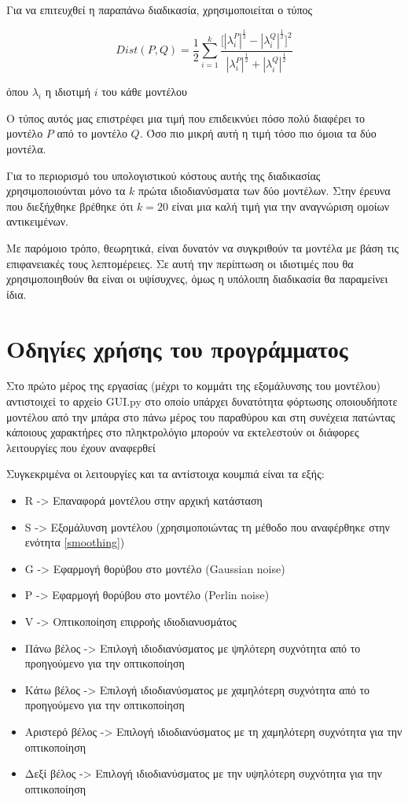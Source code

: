 \documentclass{article}
\begin{document}
Για να επιτευχθεί η παραπάνω διαδικασία, χρησιμοποιείται ο τύπος

\[
	Dist(P, Q) = {
		\frac {1} {2}
		\sum^{k}_{i=1} {
			\frac
			{
				\Big[
					|\lambda^{P}_{i}|^{\frac{1}{2}} - |\lambda^{Q}_{i}|^{\frac{1}{2}}
				\Big]^2
			}
			{
				|\lambda^{P}_{i}|^{\frac{1}{2}} + |\lambda^{Q}_{i}|^{\frac{1}{2}}
			}
		}
	}
\]

\noindent
όπου $\lambda_{i}$ η ιδιοτιμή $i$ του κάθε μοντέλου

Ο τύπος αυτός μας επιστρέφει μια τιμή που επιδεικνύει πόσο πολύ διαφέρει το μοντέλο
$P$ από το μοντέλο $Q$. Όσο πιο μικρή αυτή η τιμή τόσο πιο όμοια τα δύο μοντέλα.

Για το περιορισμό του υπολογιστικού κόστους αυτής της διαδικασίας χρησιμοποιούνται μόνο
τα $k$ πρώτα ιδιοδιανύσματα των δύο μοντέλων. Στην έρευνα που διεξήχθηκε βρέθηκε ότι
$k=20$ είναι μια καλή τιμή για την αναγνώριση ομοίων αντικειμένων.

Με παρόμοιο τρόπο, θεωρητικά, είναι δυνατόν να συγκριθούν τα μοντέλα με βάση τις
επιφανειακές τους λεπτομέρειες. Σε αυτή την περίπτωση οι ιδιοτιμές που θα χρησιμοποιηθούν
θα είναι οι υψίσυχνες, όμως η υπόλοιπη διαδικασία θα παραμείνει ίδια.


\section{Οδηγίες χρήσης του προγράμματος}
Στο πρώτο μέρος της εργασίας (μέχρι το κομμάτι της εξομάλυνσης του μοντέλου)
αντιστοιχεί το αρχείο GUI.py στο οποίο υπάρχει δυνατότητα φόρτωσης οποιουδήποτε
μοντέλου από την μπάρα στο πάνω μέρος του παραθύρου και στη συνέχεια πατώντας
κάποιους χαρακτήρες στο πληκτρολόγιο μπορούν να εκτελεστούν οι διάφορες
λειτουργίες που έχουν αναφερθεί

Συγκεκριμένα οι λειτουργίες και τα αντίστοιχα κουμπιά είναι τα εξής:

\begin{itemize}
	\item R -> Επαναφορά μοντέλου στην αρχική κατάσταση
	\item S -> Εξομάλυνση μοντέλου (χρησιμοποιώντας τη μέθοδο που αναφέρθηκε
		στην ενότητα \ref{smoothing})
	\item G -> Εφαρμογή θορύβου στο μοντέλο (Gaussian noise)
	\item P -> Εφαρμογή θορύβου στο μοντέλο (Perlin noise)
	\item V -> Οπτικοποίηση επιρροής ιδιοδιανυσμάτος
	\item Πάνω βέλος -> Επιλογή ιδιοδιανύσματος με ψηλότερη συχνότητα από το
		προηγούμενο για την οπτικοποίηση
	\item Κάτω βέλος -> Επιλογή ιδιοδιανύσματος με χαμηλότερη συχνότητα από το
		προηγούμενο για την οπτικοποίηση
	\item Αριστερό βέλος -> Επιλογή ιδιοδιανύσματος με τη χαμηλότερη συχνότητα
		για την οπτικοποίηση
	\item Δεξί βέλος -> Επιλογή ιδιοδιανύσματος με την υψηλότερη συχνότητα
		για την οπτικοποίηση
\end{itemize}
\end{document}
